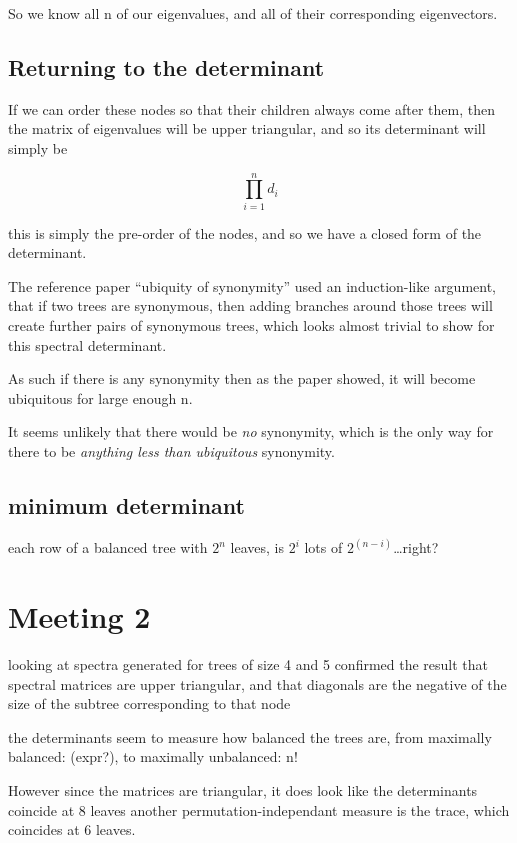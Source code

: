 \documentclass{report}
\begin{document}
So we know all n of our eigenvalues, and all of their corresponding
eigenvectors.


\subsection{Returning to the determinant}


If we can order these nodes so that their children always come after them, then
the matrix of eigenvalues will be upper triangular, and so its determinant will
simply be

\[\prod_{i=1}^n d_i\]

this is simply the pre-order of the nodes, and so we have a closed form of the
determinant.

The reference paper ``ubiquity of synonymity'' used an induction-like argument,
that if two trees are synonymous, then adding branches around those trees will
create further pairs of synonymous trees, which looks almost trivial to show
for this spectral determinant.

As such if there is any synonymity then as the paper showed, it will become
ubiquitous for large enough n.

It seems unlikely that there would be \emph{no} synonymity, which is the only way
for there to be \emph{anything less than ubiquitous} synonymity.


\subsection{minimum determinant}

each row of a balanced tree with $2^n$ leaves, is $2^i$ lots of $2^(n-i)$\ldots right?

\section{Meeting 2}


looking at spectra generated for trees of size 4 and 5 confirmed the result
that spectral matrices are upper triangular, and that diagonals are the
negative of the size of the subtree corresponding to that node

the determinants seem to measure how balanced the trees are, from maximally
balanced: (expr?), to maximally unbalanced: n!


However since the matrices are triangular, it does look like the determinants
coincide at 8 leaves
another permutation-independant measure is the trace, which coincides at 6
leaves.
\end{document}

